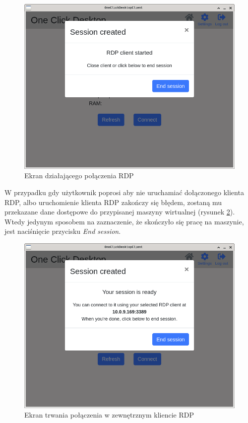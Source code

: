 \documentclass[../opis-rozwiazania.tex]{subfiles}
\begin{document}
\begin{figure}[h!]
  \centering
  \includegraphics[width=\textwidth]{resources/client_session.png}
  \caption{Ekran działającego połączenia RDP}
  \label{figure:system_interaction.client.session}
\end{figure}

W przypadku gdy użytkownik poprosi aby nie uruchamiać dołączonego klienta RDP, albo uruchomienie klienta RDP zakończy się błędem, zostaną mu przekazane dane dostępowe do przypisanej maszyny wirtualnej (rysunek \ref{figure:system_interaction.client.session_nordp}).
Wtedy jedynym sposobem na zaznaczenie, że skończyło się pracę na maszynie, jest naciśnięcie przycisku \textit{End session}.

\begin{figure}[h!]
  \centering
  \includegraphics[width=\textwidth]{resources/client_session_nordp.png}
  \caption{Ekran trwania połączenia w zewnętrznym kliencie RDP}
  \label{figure:system_interaction.client.session_nordp}
\end{figure}
\end{document}
